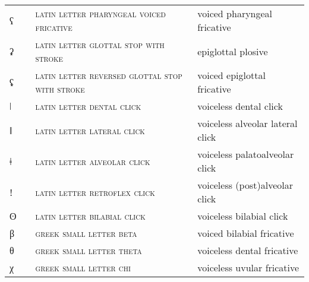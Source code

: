\begin{center}
\begin{xtabular}{ l L{1.2cm} L{5.4cm} L{4.2cm} }
ʕ &  & \textsc{latin letter pharyngeal voiced fricative} & voiced pharyngeal fricative \\ 
ʡ &  & \textsc{latin letter glottal stop with stroke} & epiglottal plosive \\ 
ʢ &  & \textsc{latin letter reversed glottal stop with stroke} & voiced epiglottal fricative \\ 
ǀ &  & \textsc{latin letter dental click} & voiceless dental click \\ 
ǁ &  & \textsc{latin letter lateral click} & voiceless alveolar lateral click \\ 
ǂ &  & \textsc{latin letter alveolar click} & voiceless palatoalveolar click \\ 
ǃ &  & \textsc{latin letter retroflex click} & voiceless (post)alveolar click \\ 
ʘ &  & \textsc{latin letter bilabial click} & voiceless bilabial click \\ 
β &  & \textsc{greek small letter beta} & voiced bilabial fricative \\ 
θ &  & \textsc{greek small letter theta} & voiceless dental fricative \\ 
χ &  & \textsc{greek small letter chi} & voiceless uvular fricative \\
\end{xtabular}
\end{center}
